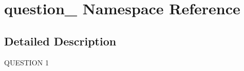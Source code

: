 \hypertarget{namespacequestion__1}{}\section{question\+\_ Namespace Reference}
\label{namespacequestion__1}


\subsection{Detailed Description}
\begin{DoxyVerb}QUESTION 1\end{DoxyVerb}
 
